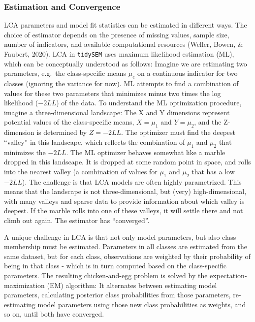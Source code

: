 \documentclass[
  ,man,floatsintext]{apa6}
\begin{document}
\hypertarget{estimation-and-convergence}{%
\subsubsection{Estimation and Convergence}\label{estimation-and-convergence}}

LCA parameters and model fit statistics can be estimated in different
ways. The choice of estimator depends on the presence of missing values,
sample size, number of indicators, and available computational resources
(Weller, Bowen, \& Faubert, 2020). LCA in \texttt{tidySEM} uses maximum likelihood
estimation (ML), which can be conceptually understood as follows:
Imagine we are estimating two parameters, e.g.~the class-specific means
\(\mu_c\) on a continuous indicator for two classes (ignoring the variance
for now). ML attempts to find a combination of values for these two
parameters that minimizes minus two times the log likelihood (\(-2LL\)) of
the data.
To understand the ML optimization procedure, imagine a three-dimensional
landscape: The X and Y dimensions represent potential values of the
class-specific means, \(X = \mu_1\) and \(Y = \mu_2\), and the Z-dimension
is determined by \(Z = -2LL\). The optimizer must find the deepest
``valley'' in this landscape, which reflects the combination of \(\mu_1\)
and \(\mu_2\) that minimizes the \(-2LL\). The ML optimizer behaves somewhat
like a marble dropped in this landscape. It is dropped at some random
point in space, and rolls into the nearest valley (a combination of
values for \(\mu_1\) and \(\mu_2\) that has a low \(-2LL\)). The challenge is
that LCA models are often highly parametrized. This means that the
landscape is not three-dimensional, but (very) high-dimensional, with
many valleys and sparse data to provide information about which valley
is deepest. If the marble rolls into one of these valleys, it will
settle there and not climb out again. The estimator has ``converged''.

A unique challenge in LCA is that not only model parameters, but also
class membership must be estimated. Parameters in all classes are
estimated from the same dataset, but for each class, observations are
weighted by their probability of being in that class - which is in turn
computed based on the class-specific parameters. The resulting
chicken-and-egg problem is solved by the expectation-maximization (EM)
algorithm: It alternates between estimating model parameters,
calculating posterior class probabilities from those parameters,
re-estimating model parameters using those new class probabilities as
weights, and so on, until both have converged.
\end{document}
